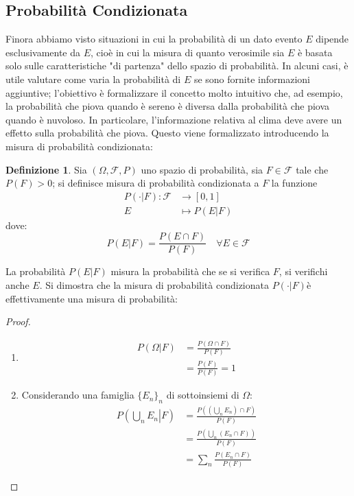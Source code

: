 \documentclass{article}
\theoremstyle{plain}
\theoremstyle{definition}
\newtheorem{definizione}{Definizione}[section]
\theoremstyle{remark}
\begin{document}
\subsection{Probabilità Condizionata} %
\label{sub:probabilità_condizionata}
Finora abbiamo visto situazioni in cui la probabilità di un dato evento $E$ dipende esclusivamente da $E$, cioè in cui la misura di quanto verosimile sia $E$ è basata solo sulle caratteristiche "di partenza" dello spazio di probabilità. In alcuni casi, è utile valutare come varia la probabilità di $E$ se sono fornite informazioni aggiuntive; l'obiettivo è formalizzare il concetto molto intuitivo che, ad esempio, la probabilità che piova quando è sereno è diversa dalla probabilità che piova quando è nuvoloso. In particolare, l'informazione relativa al clima deve avere un effetto sulla probabilità che piova. Questo viene formalizzato introducendo la misura di probabilità condizionata:
\begin{definizione}
	Sia $(\Omega,\mathcal{F},P)$ uno spazio di probabilità, sia $F\in\mathcal{F}$ tale che $P(F)>0$; si definisce misura di probabilità condizionata a $F$ la funzione
	\begin{align*}
		P(\cdot|F):\mathcal{F}&\to[0,1]\\
		E&\mapsto P(E|F)
	\end{align*}
	dove:
	\begin{equation*}
		P(E|F)=\frac{P(E\cap F)}{P(F)}\quad \forall E\in\mathcal{F}
	\end{equation*}
\end{definizione}
La probabilità $P(E|F)$ misura la probabilità che se si verifica $F$, si verifichi anche $E$. Si dimostra che la misura di probabilità condizionata $P(\cdot|F)$è effettivamente una misura di probabilità:
\begin{proof}
	\begin{enumerate}
		\item 
		\begin{align*}
			P(\Omega|F)&=\frac{P(\Omega\cap F)}{P(F)}\\
			&=\frac{P(F)}{P(F)}=1
		\end{align*}
		\item Considerando una famiglia $\{E_n\}_n$ di sottoinsiemi di $\Omega$:
		\begin{align*}
			P\left(\left.\bigcup_n E_n\right|F \right)&=\frac{P\left(\left(\bigcup_n E_n\right)\cap F\right)}{P(F)}\\
			&=\frac{P\left(\bigcup_n (E_n\cap F)\right)}{P(F)}\\
			&=\sum_n \frac{P(E_n\cap F)}{P(F)}
		\end{align*}
	\end{enumerate}
	\qedhere
\end{proof}
\end{document}
